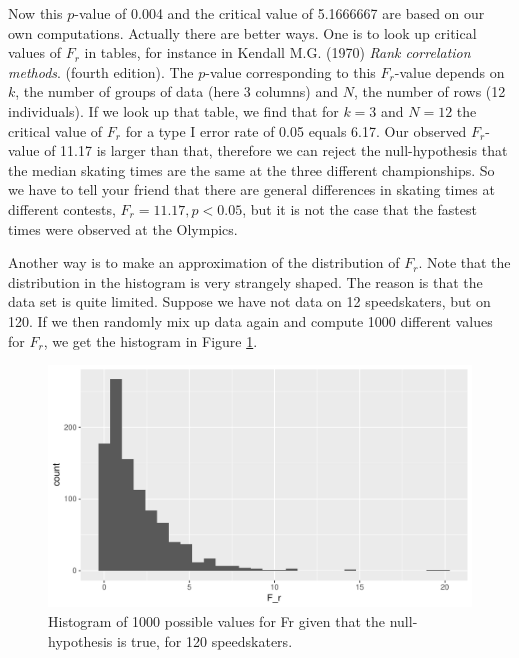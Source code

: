 \documentclass[]{report}\usepackage[]{graphicx}\usepackage[]{color}
\makeatletter
\def\maxwidth{ %
  \ifdim\Gin@nat@width>\linewidth
    \linewidth
  \else
    \Gin@nat@width
  \fi
}
\newenvironment{knitrout}{}{} %
\makeatother
\begin{document}
Now this $p$-value of 0.004 and the critical value of 5.1666667 are based on our own computations. Actually there are better ways. One is to look up critical values of $F_r$ in tables, for instance in Kendall M.G. (1970) \textit{Rank correlation methods}. (fourth edition). The $p$-value corresponding to this $F_r$-value depends on $k$, the number of groups of data (here 3 columns) and $N$, the number of rows (12 individuals). If we look up that table, we find that for $k=3$ and $N=12$ the critical value of $F_r$ for a type I error rate of 0.05 equals 6.17. Our observed $F_r$-value of 11.17 is larger than that, therefore we can reject the null-hypothesis that the median skating times are the same at the three different championships. So we have to tell your friend that there are general differences in skating times at different contests, $F_r=11.17, p < 0.05$, but it is not the case that the fastest times were observed at the Olympics.

Another way is to make an approximation of the distribution of $F_r$. Note that the distribution in the histogram is very strangely shaped. The reason is that the data set is quite limited. Suppose we have not data on 12 speedskaters, but on 120. If we then randomly mix up data again and compute 1000 different values for $F_r$, we get the histogram in Figure \ref{fig:nonparmixed_46}.


\begin{knitrout}
\color{fgcolor}\begin{figure}

{\centering \includegraphics[width=\maxwidth]{figure/nonparmixed_46-1} 

}

\caption[Histogram of 1000 possible values for Fr given that the null-hypothesis is true, for 120 speedskaters]{Histogram of 1000 possible values for Fr given that the null-hypothesis is true, for 120 speedskaters.}\label{fig:nonparmixed_46}
\end{figure}


\end{knitrout}
\end{document}
